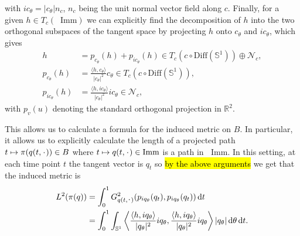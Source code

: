 \message{ !name(tangent_space_of_curves.tex)}\documentclass[a4,danish]{article}
\theoremstyle{break}
\theoremstyle{definition}
\theoremstyle{Break}
\newcommand{\R}{\mathbb{R}}
\newcommand*\I{\mathop{}\!\mathrm{Imm}}
\renewcommand{\S}{\mathbb{S}}
\newcommand{\blank}{\makebox[1ex]{\textbf{$\cdot$}}}
\newcommand*\diff{\mathop{}\!\mathrm{d}}
\begin{document}
with $i c_{\theta} = |c_{\theta}| n_c$, $n_c$ being the unit normal
vector field along $c$. Finally, for a given $h \in T_c(\I)$
we can explicitly find the decomposition of $h$ into the two orthogonal
subspaces of the tangent space by projecting $h$ onto $c_{\theta}$ and
$ic_{\theta}$, which gives
\begin{equation*}
  \begin{aligned}
    h &  = p_{c_{\theta}}(h) + p_{ic_{\theta}}(h)
    \in T_c(c \circ \text{Diff}(\S^{1})) \oplus \mathcal{N}_c
    ,\\
    p_{c_{\theta}}(h) & = 
    \frac{\langle h, c_{\theta}\rangle}{|c_{\theta}|^2} c_{\theta}
    \in T_c(c \circ \text{Diff}(\S^{1})), \\
    p_{ic_{\theta}}(h) & = 
    \frac{\langle h, ic_{\theta}\rangle}{|c_{\theta}|^2} ic_{\theta}
    \in \mathcal{N}_c,
  \end{aligned}
\end{equation*}
with $p_{v}(u)$ denoting the standard orthogonal projection in $\R^2$.

This allows us to calculate a formula for
the induced metric on $B$. In particular, it allows us to explicitly calculate
the length of a projected path $t \mapsto \pi(q(t,\blank)) \in B $
where $t \mapsto q(t,\blank) \in \I$ is a path in $\I$.
In this setting, at each time point $t$
the tangent vector is $q_t$ so \hl{by the above arguments} we get that
the induced metric is
\begin{equation*}
  \begin{aligned}
    L^2(\pi(q))& = \int_{0}^{1}
    G^2_{q(t,\blank)}(p_{iq_{\theta}}(q_t),p_{iq_{\theta}}(q_t)) \diff t \\
    & = \int_{0}^{1}
    \int_{\S^1} 
    \left\langle
      \frac{\langle h, iq_{\theta}\rangle}{|q_{\theta}|^2} iq_{\theta},
      \frac{\langle h, iq_{\theta}\rangle}{|q_{\theta}|^2} iq_{\theta}
  \right\rangle | q_{\theta}|\diff \theta \diff t.
  \end{aligned}
\end{equation*}
\end{document}
